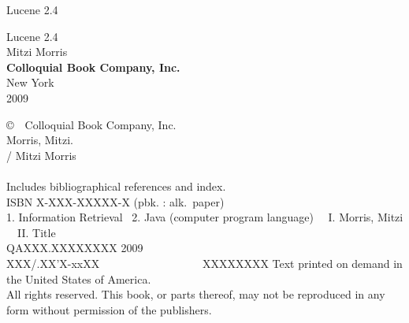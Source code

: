 \documentclass[11pt]{book}
\begin{document}
\setcounter{chapter}{0}
\setcounter{section}{0}
\pagestyle{empty}

\cleardoublepage
\vspace*{2.375in}
\begin{center}
{\hfill {\Huge Lucene 2.4}}
\end{center}


\cleardoublepage
\vspace*{1.125in}
\begin{center}
{\hfill {\fontsize{70}{100}\selectfont Lucene 2.4}}
\\[0.75in]
{\hfill {\Huge Mitzi Morris}}
\\[-1pt]
\vfill
{\hfill {\large\bf Colloquial Book Company, Inc.}}
\\[1pt]
{\hfill {\small New York}}
\\[-1pt]
{\hfill {\small 2009}}
\end{center}

\clearpage
\vspace*{1.25in}
\noindent
{\footnotesize%
\copyright \ \ Colloquial Book Company, Inc.
\hfill
\vfill
\vfill
{}
\\[6pt]
Morris, Mitzi.
\\
\hspace*{0.125in}{\it Lucene 2.4} / Mitzi Morris
\\
\hspace*{.5in}{p. cm.}
\\
\hspace*{0.125in}Includes bibliographical references and index.
\\
\hspace*{0.125in}ISBN X-XXX-XXXXX-X (pbk. : alk.~paper)
\\[4pt]
1. Information Retrieval  \ 2. Java (computer program language) \ \ I. Morris, Mitzi \ \ II. Title
\\[2pt]
\hspace*{0.125in}QAXXX.XXXXXXXX 2009
\\[2pt]
\hspace*{0.125in}XXX/.XX'X-xxXX      \ \ \ \ \ \ \ \ \ \ \ \ \ \ \ \ \  \ XXXXXXXX
\vfill
\noindent
Text printed on demand in the United States of America.
\\[12pt]
All rights reserved. This book, or parts thereof, may not
be reproduced in any form without permission of the publishers.
}
\end{document}
